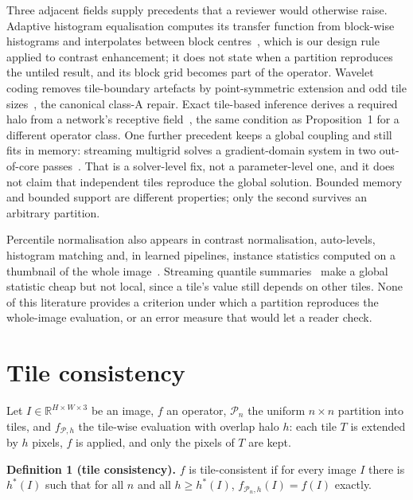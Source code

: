 \documentclass[journal]{IEEEtran}
\begin{document}
Three adjacent fields supply precedents that a reviewer would otherwise raise. Adaptive histogram equalisation computes its transfer function from block-wise histograms and interpolates between block centres~\cite{pizer1987clahe}, which is our design rule applied to contrast enhancement; it does not state when a partition reproduces the untiled result, and its block grid becomes part of the operator. Wavelet coding removes tile-boundary artefacts by point-symmetric extension and odd tile sizes~\cite{kharitonenko2002wavelet,wei2005tile}, the canonical class-A repair. Exact tile-based inference derives a required halo from a network's receptive field~\cite{majurski2021exact}, the same condition as Proposition~1 for a different operator class. One further precedent keeps a global coupling and still fits in memory: streaming multigrid solves a gradient-domain system in two out-of-core passes~\cite{kazhdan2008smg}. That is a solver-level fix, not a parameter-level one, and it does not claim that independent tiles reproduce the global solution. Bounded memory and bounded support are different properties; only the second survives an arbitrary partition.

Percentile normalisation also appears in contrast normalisation, auto-levels, histogram matching and, in learned pipelines, instance statistics computed on a thumbnail of the whole image~\cite{chen2022urst}. Streaming quantile summaries~\cite{greenwald2001gk} make a global statistic cheap but not local, since a tile's value still depends on other tiles. None of this literature provides a criterion under which a partition reproduces the whole-image evaluation, or an error measure that would let a reader check.

\section{Tile consistency}\label{sec:theory}

Let \(I\in\mathbb R^{H\times W\times 3}\) be an image, \(f\) an operator, \(\mathcal P_n\) the uniform \(n\times n\) partition into tiles, and \(f_{\mathcal P,h}\) the tile-wise evaluation with overlap halo \(h\): each tile \(T\) is extended by \(h\) pixels, \(f\) is applied, and only the pixels of \(T\) are kept.

\textbf{Definition 1 (tile consistency).} \(f\) is tile-consistent if for every image \(I\) there is \(h^*(I)\) such that for all \(n\) and all \(h\ge h^*(I)\), \(f_{\mathcal P_n,h}(I)=f(I)\) exactly.
\end{document}
